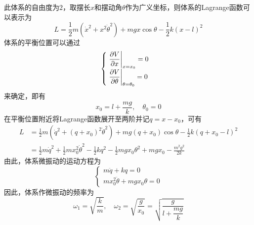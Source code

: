 \begin{solution}
此体系的自由度为$2$，取摆长$x$和摆动角$\theta$作为广义坐标，则体系的Lagrange函数可以表示为
\begin{equation*}
	L = \frac12 m \left(\dot{x}^2 + x^2 \dot{\theta}^2\right) + mgx\cos \theta - \frac12 k (x-l)^2
\end{equation*}
体系的平衡位置可以通过
\begin{equation*}
\begin{cases}
	\left.\dfrac{\partial V}{\partial x}\right|_{x=x_0} = 0 \\[1.5ex]
	\left.\dfrac{\partial V}{\partial \theta}\right|_{\theta=\theta_0} = 0
\end{cases}
\end{equation*}
来确定，即有
\begin{equation*}
	x_0 = l + \frac{mg}{k},\quad \theta_0 = 0
\end{equation*}
在平衡位置附近将Lagrange函数展开至两阶并记$q=x-x_0$，可有
\begin{align*}
	L & = \frac12 m \left(\dot{q}^2 + (q+x_0)^2 \dot{\theta}^2\right) + mg(q+x_0) \cos \theta - \frac12 k(q+x_0-l)^2 \\
	& = \frac12 m \dot{q}^2 + \frac12 m x_0^2 \dot{\theta}^2 - \frac12 kq^2 - \frac12 mgx_0 \theta^2 + mgx_0 - \frac{m^2 g^2}{2k}
\end{align*}
由此，体系微振动的运动方程为
\begin{equation*}
\begin{cases}
	m\ddot{q}+kq = 0 \\
	mx_0^2 \ddot{\theta} + mgx_0 \theta = 0
\end{cases}
\end{equation*}
因此，体系作微振动的频率为
\begin{equation*}
	\omega_1 = \sqrt{\frac{k}{m}},\quad \omega_2 = \sqrt{\frac{g}{x_0}} = \sqrt{\frac{g}{l + \dfrac{mg}{k}}}
\end{equation*}
\end{solution}

